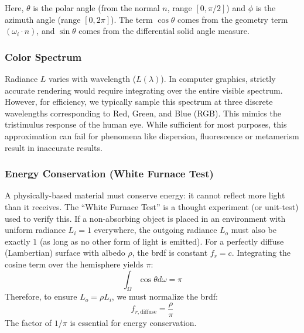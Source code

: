 Here, $\theta$ is the polar angle (from the normal $n$, range $[0, \pi/2]$)
and $\phi$ is the azimuth angle (range $[0, 2\pi]$).
The term $\cos\theta$ comes from the geometry term $(\omega_i \cdot n)$,
and $\sin\theta$ comes from the differential solid angle measure.

\subsubsection{Color Spectrum}

Radiance $L$ varies with wavelength ($L(\lambda)$).
In computer graphics, strictly accurate rendering would require integrating over the entire visible spectrum.
However, for efficiency, we typically sample this spectrum at three discrete wavelengths corresponding to Red, Green,
and Blue (RGB).
This mimics the tristimulus response of the human eye.
While sufficient for most purposes, this approximation can fail for phenomena like
dispersion, fluorescence or metamerism result in inaccurate results.

\subsubsection{Energy Conservation (White Furnace Test)}

A physically-based material must conserve energy: it cannot reflect more light than it receives.
The ``White Furnace Test'' is a thought experiment (or unit-test) used to verify this.
If a non-absorbing object is placed in an environment with uniform radiance $L_i = 1$ everywhere,
the outgoing radiance $L_o$ must also be exactly $1$ (as long as no other form of light is emitted).
For a perfectly diffuse (Lambertian) surface with albedo $\rho$, the \gls{brdf} is constant $f_r = c$.
Integrating the cosine term over the hemisphere yields $\pi$:
\[
    \int_{\Omega} \cos\theta d\omega = \pi
\]
Therefore, to ensure $L_o = \rho L_i$, we must normalize the \gls{brdf}:
\[
f_{r, \text{diffuse}} = \frac{\rho}{\pi}
\]
The factor of $1/\pi$ is essential for energy conservation.





